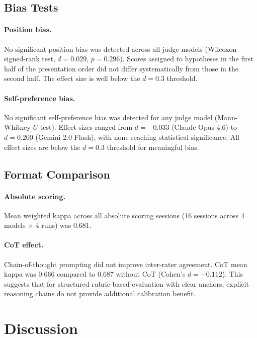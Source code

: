 \documentclass[11pt,a4paper]{article}
\begin{document}
\subsection{Bias Tests}

\paragraph{Position bias.}  No significant position bias was detected
across all judge models (Wilcoxon signed-rank test, $d = 0.029$,
$p = 0.296$).  Scores assigned to hypotheses in the first half of the
presentation order did not differ systematically from those in the second
half.  The effect size is well below the $d = 0.3$ threshold.

\paragraph{Self-preference bias.}  No significant self-preference bias was
detected for any judge model (Mann-Whitney $U$ test).  Effect sizes ranged
from $d = -0.033$ (Claude Opus 4.6) to $d = 0.200$ (Gemini 2.0 Flash),
with none reaching statistical significance.  All effect sizes are below
the $d = 0.3$ threshold for meaningful bias.

\subsection{Format Comparison}

\paragraph{Absolute scoring.}  Mean weighted kappa across all absolute
scoring sessions (16 sessions across 4 models $\times$ 4 runs) was 0.681.

\paragraph{CoT effect.}  Chain-of-thought prompting did not improve
inter-rater agreement.  CoT mean kappa was 0.666 compared to 0.687
without CoT (Cohen's $d = -0.112$).  This suggests that for structured
rubric-based evaluation with clear anchors, explicit reasoning chains do
not provide additional calibration benefit.

\section{Discussion}
\label{sec:discussion}
\end{document}
